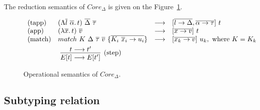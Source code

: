 \documentclass[11pt]{article}
\newcommand{\ap}{~}
\begin{document}
    The reduction semantics of $Core_\Delta$ is given on the Figure\ \ref{fig:core-operational}.

    \begin{figure}
        \begin{gather*}
            \begin{array}{llll}
                \text{(tapp)} & (\Lambda \overline{l}~\overline{\alpha}\ldotp t)\ap \overline{\Delta} \ap \overline{\tau} & \longrightarrow & [\overline{l \to \Delta}, \overline{\alpha\to\tau}]\ap t
                \\
                \text{(app)} & (\lambda \overline{x}\ldotp t) \ap \overline{v} & \longrightarrow & [\overline{x\to v}]\ap t
                \\
                \text{(match)} & match ~K \ap\Delta\ap\overline{\tau}\ap \overline{v} ~ \{ \overline{K_i \ap \overline{x}_i \to u_i}\} & \longrightarrow & [\overline{x_k\to v}]\ap u_k, \text{ where } K = K_k
            \end{array}\\
            \hspace{-15em}\infer[\text{(step)}]{E[t]\longrightarrow E[t']}{t\longrightarrow t'}
        \end{gather*}
        \caption{Operational semantics of $Core_\Delta$.}
        \label{fig:core-operational}
    \end{figure}

    \subsection{Subtyping relation}
\end{document}
